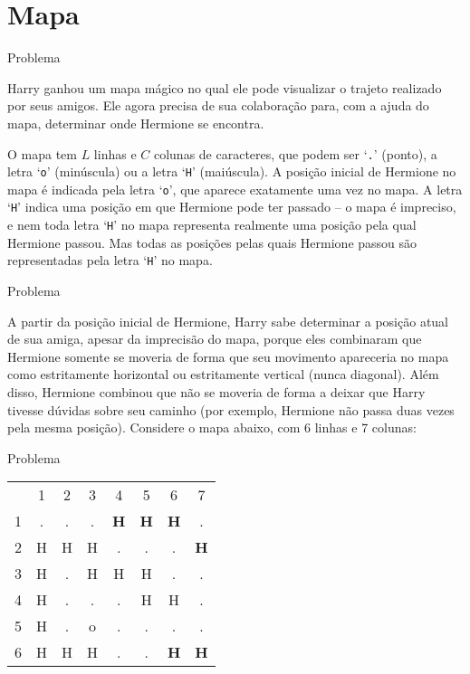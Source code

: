 \section{Mapa}

\begin{frame}[fragile]{Problema}

Harry ganhou um mapa mágico no qual ele pode visualizar o trajeto realizado por seus amigos. Ele
agora precisa de sua colaboração para, com a ajuda do mapa, determinar onde Hermione se encontra.

O mapa tem $L$ linhas e $C$ colunas de caracteres, que podem ser `\texttt{.}' (ponto), a letra 
`\texttt{o}' (minúscula) ou a letra `\texttt{H}' (maiúscula). A posição inicial de Hermione no mapa
é indicada pela letra `\texttt{o}', que aparece exatamente uma vez no mapa. A letra `\texttt{H}'
indica uma posição em que Hermione pode ter passado -- o mapa é impreciso, e nem toda letra 
`\texttt{H}' no mapa representa realmente uma posição pela qual Hermione passou. Mas todas as
posições pelas quais Hermione passou são representadas pela letra `\texttt{H}' no mapa.

\end{frame}


\begin{frame}[fragile]{Problema}

A partir da posição inicial de Hermione, Harry sabe determinar a posição atual de sua amiga, apesar
da imprecisão do mapa, porque eles combinaram que Hermione somente se moveria de forma que seu
movimento apareceria no mapa como estritamente horizontal ou estritamente vertical (nunca diagonal).
Além disso, Hermione combinou que não se moveria de forma a deixar que Harry tivesse dúvidas sobre
seu caminho (por exemplo, Hermione não passa duas vezes pela mesma posição). Considere o mapa
abaixo, com 6 linhas e 7 colunas:

\end{frame}

\begin{frame}[fragile]{Problema}

    \begin{table}[!ht]
        \centering
        \begin{tabular}{cccccccc}
            & 1 & 2 & 3 & 4 & 5 & 6 & 7 \\
            1 & . & . & . & \textbf{H} & \textbf{H} & \textbf{H} & . \\
            2 & H & H & H & . & . & . & \textbf{H} \\
            3 & H & . & H & H & H & . & . \\
            4 & H & . & . & . & H & H & . \\
            5 & H & . & o & . & . & . & . \\
            6 & H & H & H & . & . & \textbf{H} & \textbf{H} \\
        \end{tabular}
    \end{table}

\end{frame}


